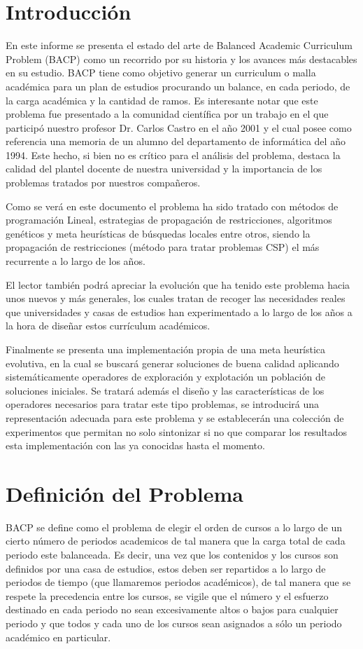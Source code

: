 \documentclass[letter, 10pt]{article}
\begin{document}
\section{Introducción}
En este informe se presenta el estado del arte de Balanced Academic Curriculum
Problem (BACP) como un recorrido por su historia y los avances más destacables
en su estudio.  BACP tiene como objetivo generar un curriculum o malla académica
para un plan de estudios procurando un balance, en cada periodo, de la carga
académica y la cantidad de ramos. Es interesante notar que este problema fue
presentado a la comunidad científica por un trabajo en el que participó nuestro
profesor Dr. Carlos Castro\cite{castro2001variable} en el año 2001 y el cual
posee como referencia una memoria de un alumno del departamento de informática
del año 1994\cite{vergara}. Este hecho, si bien no es crítico para el análisis
del problema, destaca la calidad del plantel docente de nuestra universidad y la
importancia de los problemas tratados por nuestros compañeros.

Como se verá en este documento el problema ha sido tratado con métodos de
programación Lineal, estrategias de propagación de restricciones, algoritmos
genéticos y meta heurísticas de búsquedas locales entre otros, siendo la
propagación de restricciones (método para tratar problemas CSP) el más
recurrente a lo largo de los años.

El lector también podrá apreciar la evolución que ha tenido este
problema hacia unos nuevos y más generales, los cuales tratan de
recoger las necesidades reales que universidades y casas de estudios
han experimentado a lo largo de los años a la hora de diseñar estos
currículum académicos.

Finalmente se presenta una implementación propia de una meta
heurística evolutiva, en la cual se buscará generar soluciones de
buena calidad aplicando sistemáticamente operadores de exploración y
explotación un población de soluciones iniciales. Se tratará además el
diseño y las características de los operadores necesarios para tratar
este tipo problemas, se introducirá una representación adecuada para
este problema y se establecerán una colección de experimentos que
permitan no solo sintonizar si no que comparar los resultados esta
implementación con las ya conocidas hasta el momento.



\section{Definición del Problema}
BACP se define como el problema de elegir el orden de cursos a lo largo
de un cierto número de periodos academicos de tal manera que la carga
total de cada periodo este balanceada. Es decir, una vez que los
contenidos y los cursos son definidos por una casa de estudios, estos
deben ser repartidos a lo largo de periodos de tiempo (que llamaremos
periodos académicos), de tal manera que se respete la precedencia entre
los cursos, se vigile que el número y el esfuerzo destinado en cada
periodo no sean excesivamente altos o bajos para cualquier periodo y que
todos y cada uno de los cursos sean asignados a sólo un periodo
académico en particular.
\end{document}
